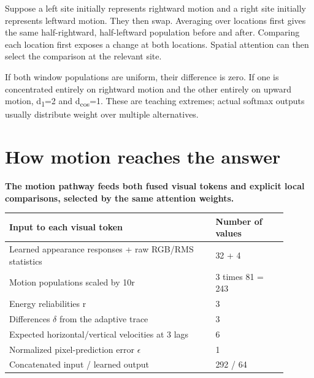 \documentclass[11pt,letterpaper]{article}
\begin{document}
Suppose a left site initially represents rightward motion and a right site initially represents leftward motion. They then swap. Averaging over locations first gives the same half-rightward, half-leftward population before and after. Comparing each location first exposes a change at both locations. Spatial attention can then select the comparison at the relevant site.


If both window populations are uniform, their difference is zero. If one is concentrated entirely on rightward motion and the other entirely on upward motion, d\textsubscript{1}=2 and d\textsubscript{cos}=1. These are teaching extremes; actual softmax outputs usually distribute weight over multiple alternatives.


\clearpage

\section{How motion reaches the answer}\label{sec14}

\textbf{The motion pathway feeds both fused visual tokens and explicit local comparisons, selected by the same attention weights.}


\begin{center}\small\renewcommand{\arraystretch}{1.16}\setlength{\tabcolsep}{4pt}\begin{tabular}{p{0.661\linewidth}p{0.239\linewidth}}\toprule

\textbf{Input to each visual token} & \textbf{Number of values} \\

\midrule

Learned appearance responses + raw RGB/\allowbreak{}RMS statistics & 32 + 4 \\

Motion populations scaled by 10r & 3 times 81 = 243 \\

Energy reliabilities r & 3 \\

Differences \(\delta\) from the adaptive trace & 3 \\

Expected horizontal/\allowbreak{}vertical velocities at 3 lags & 6 \\

Normalized pixel-prediction error \(\epsilon\) & 1 \\

Concatenated input /\allowbreak{} learned output & 292 /\allowbreak{} 64 \\

\bottomrule\end{tabular}\end{center}
\end{document}

